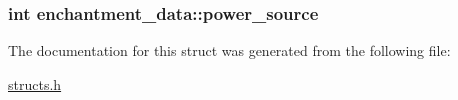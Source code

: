 \hypertarget{structenchantment__data_a119a19212a52d59675a3f7ea6b886acf}{
\subsubsection[{power\-\_\-source}]{\setlength{\rightskip}{0pt plus 5cm}int enchantment\-\_\-data\-::power\-\_\-source}}\label{structenchantment__data_a119a19212a52d59675a3f7ea6b886acf}


The documentation for this struct was generated from the following file\-:\begin{DoxyCompactItemize}
\item 
\hyperlink{structs_8h}{structs.\-h}\end{DoxyCompactItemize}
